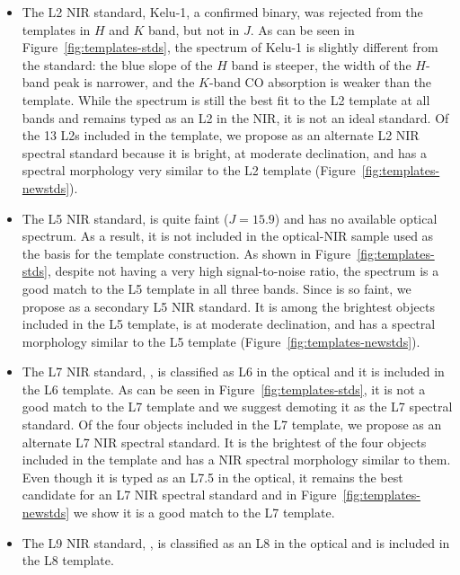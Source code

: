 \documentclass[12pt,preprint]{aastex}
\begin{document}
\begin{itemize}

	\item The L2 NIR standard,  Kelu-1, a confirmed binary, was rejected from the templates in $H$ and $K$ band, but not in $J$. As can be seen in Figure~\ref{fig:templates-stds}, the spectrum of Kelu-1 is slightly different from the standard: the blue slope of the $H$ band is steeper, the width of the $H$-band peak is narrower, and the $K$-band CO absorption is weaker than the template. While the spectrum is still the best fit to the L2 template at all bands and remains typed as an L2 in the NIR, it is not an ideal standard. Of the 13 L2s included in the template, we propose  as an alternate L2 NIR spectral standard because it is bright, at moderate declination, and has a spectral morphology very similar to the L2 template (Figure~\ref{fig:templates-newstds}).

	\item The L5 NIR standard,  is quite faint ($J=15.9$) and has no available optical spectrum. As a result, it is not included in the optical-NIR sample used as the basis for the template construction. As shown in Figure~\ref{fig:templates-stds}, despite not having a very high signal-to-noise ratio, the spectrum is a good match to the L5 template in all three bands. Since  is so faint, we propose  as a secondary L5 NIR standard. It is among the brightest objects included in the L5 template, is at moderate declination, and has a spectral morphology similar to the L5 template (Figure~\ref{fig:templates-newstds}). 

	\item The L7 NIR standard, , is classified as L6 in the optical \cite{K00} and it is included in the L6 template. 
	As can be seen in Figure~\ref{fig:templates-stds}, it is not a good match to the L7 template and we suggest demoting it as the L7 spectral standard. 
	Of the four objects included in the L7 template, we propose  as an alternate L7 NIR spectral standard. 
	It is the brightest of the four objects included in the template and has a NIR spectral morphology similar to them. 
	Even though it is typed as an L7.5 in the optical, it remains the best candidate for an L7 NIR spectral standard and in Figure~\ref{fig:templates-newstds} we show it is a good match to the L7 template.	
		
	\item The L9 NIR standard, , is classified as an L8 in the optical and is included in the L8 template. 
	
\end{itemize}
\end{document}
